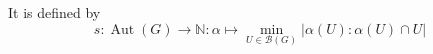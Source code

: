 \documentclass[preview]{standalone}
\begin{document}
It is defined by \[ s : \operatorname{Aut}(G) \to \mathbb{N} : \alpha \mapsto \min_{U \in \mathcal{B}(G)} |\alpha(U) : \alpha(U) \cap U | \]\\
\end{document}
